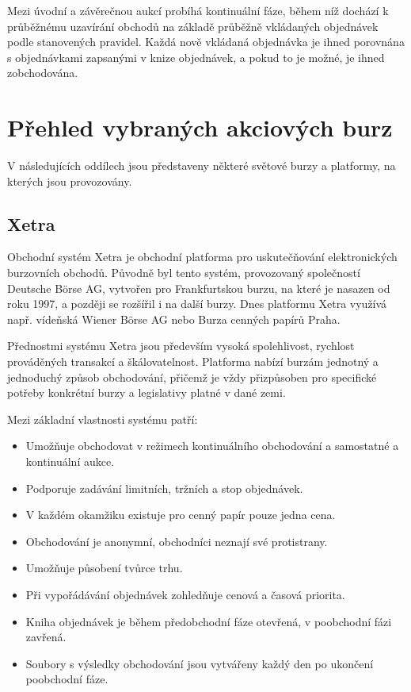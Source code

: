 \documentclass[thesis=M,czech]{FITthesis}[2012/06/26]
\begin{document}
Mezi úvodní a závěrečnou aukcí probíhá kontinuální fáze, během níž dochází k průběžnému uzavírání obchodů na 
základě průběžně vkládaných objednávek podle stanovených pravidel. Každá nově vkládaná objednávka je 
ihned porovnána s objednávkami zapsanými v knize objednávek, a pokud to je možné, je ihned zobchodována.



\section{Přehled vybraných akciových burz}

V následujících oddílech jsou představeny některé světové burzy a platformy, na kterých jsou provozovány.


\subsection{Xetra}

Obchodní systém Xetra \cite{xetra} je obchodní platforma pro uskutečňování elektronických burzovních obchodů. 
Původně byl tento systém, provozovaný společností Deutsche Börse AG, vytvořen pro Frankfurtskou burzu, na které 
je nasazen od roku 1997, a později se rozšířil i na další burzy. Dnes platformu Xetra využívá např. vídeňská Wiener 
Börse AG nebo Burza cenných papírů Praha.

Přednostmi systému Xetra jsou především vysoká spolehlivost, rychlost prováděných transakcí a škálovatelnost. 
Platforma nabízí burzám jednotný a jednoduchý způsob obchodování, přičemž je vždy přizpůsoben pro specifické 
potřeby konkrétní burzy a legislativy platné v dané zemi.

Mezi základní vlastnosti systému patří:

\begin{itemize}
	\item Umožňuje obchodovat v režimech kontinuálního obchodování a samostatné a kontinuální aukce.
	\item Podporuje zadávání limitních, tržních a stop objednávek.
	\item V každém okamžiku existuje pro cenný papír pouze jedna cena.
	\item Obchodování je anonymní, obchodníci neznají své protistrany.
	\item Umožňuje působení tvůrce trhu.
	\item Při vypořádávání objednávek zohledňuje cenová a časová priorita.
	\item Kniha objednávek je během předobchodní fáze otevřená, v poobchodní fázi zavřená.
	\item Soubory s výsledky obchodování jsou vytvářeny každý den po ukončení poobchodní fáze.
\end{itemize}
\end{document}
